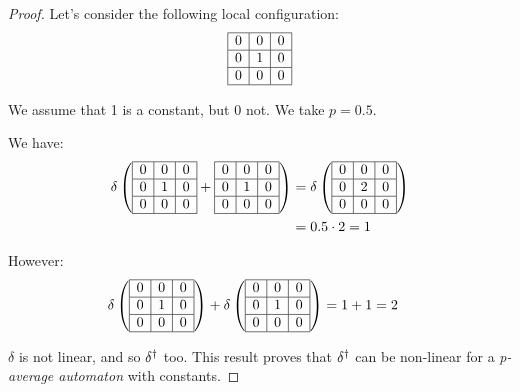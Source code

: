  \begin{proof}
   Let's consider the following local configuration:
   \[\begin{array}{ | c | c | c |} \hline
    0 & 0 & 0 \\ \hline
    0 & 1 & 0 \\ \hline
    0 & 0 & 0 \\ \hline
  \end{array}\]
  
  We assume that 1 is a constant, but 0 not. We take $p=0.5$.
  
  We have:
 \[\begin{split}
 \delta \left(\begin{array}{ | c | c | c |} \hline
  0 & 0 & 0 \\ \hline
  0 & 1 & 0 \\ \hline
  0 & 0 & 0 \\ \hline
 \end{array} + \begin{array}{ | c | c | c |} \hline
  0 & 0 & 0 \\ \hline
  0 & 1 & 0 \\ \hline
  0 & 0 & 0 \\ \hline
 \end{array} \right) & = \delta \left(\begin{array}{ | c | c | c |} \hline
  0 & 0 & 0 \\ \hline
  0 & 2 & 0 \\ \hline
  0 & 0 & 0 \\ \hline
 \end{array} \right) \\
		     & = 0.5 \cdot 2 = 1    
 \end{split}\]  
  
  However:
 \[\begin{split}
 \delta \left(\begin{array}{ | c | c | c |} \hline
  0 & 0 & 0 \\ \hline
  0 & 1 & 0 \\ \hline
  0 & 0 & 0 \\ \hline
 \end{array}\right) + \delta \left(\begin{array}{ | c | c | c |} \hline
  0 & 0 & 0 \\ \hline
  0 & 1 & 0 \\ \hline
  0 & 0 & 0 \\ \hline
 \end{array} \right) & = 1 + 1 = 2
 \end{split}\]  
  
 $\delta$ is not linear, and so $\delta^{\dag}$ too. This result proves that $\delta^{\dag}$ can be non-linear for a \textit{p-average automaton} with constants.
 \end{proof}

